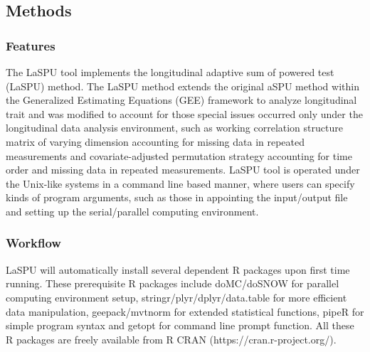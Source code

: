 \documentclass[12pt]{article}
\begin{document}
%
\subsection{Methods}
\subsubsection{Features}
The LaSPU tool implements the longitudinal adaptive sum of powered test (LaSPU) method. The LaSPU method extends the original aSPU method\cite{pan2014powerful} within the Generalized Estimating Equations (GEE) framework to analyze longitudinal trait and was modified to account for those special issues occurred only under the longitudinal data analysis environment, such as working correlation structure matrix of varying dimension accounting for missing data in repeated measurements and  covariate-adjusted permutation strategy accounting for time order and missing data in repeated measurements. LaSPU tool is operated under the Unix-like systems in a command line based manner, where users can specify kinds of program arguments, such as those in appointing the input/output file and setting up the serial/parallel computing environment.
\subsubsection{Workflow}
LaSPU will automatically install several dependent R packages upon first time running. These prerequisite R packages include doMC/doSNOW for parallel computing environment setup, stringr/plyr/dplyr/data.table for more efficient data manipulation, geepack/mvtnorm for extended statistical functions, pipeR for simple program syntax and getopt for command line prompt function. All these R packages are freely available from R CRAN (https://cran.r-project.org/).   
\end{document}
